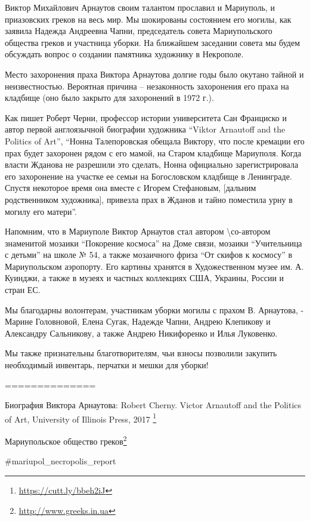 Виктор Михайлович Арнаутов своим талантом прославил и Мариуполь, и приазовских
греков на весь мир. Мы шокированы состоянием его могилы, как заявила Надежда
Андреевна Чапни, председатель совета Мариупольского общества греков и участница
уборки. На ближайшем заседании совета мы будем обсуждать вопрос о создании
памятника художнику в Некрополе.

Место захоронения праха Виктора Арнаутова долгие годы было окутано тайной и
неизвестностью. Вероятная причина – незаконность захоронения его праха на
кладбище (оно было закрыто для захоронений в 1972 г.).

Как пишет Роберт Черни, профессор истории университета Сан Франциско и автор
первой англоязычной биографии художника \enquote{Viktor Arnautoff and the Politics of
Art}, \enquote{Нонна Талепоровская обещала Виктору, что после кремации его прах будет
захоронен рядом с его мамой, на Старом кладбище Мариуполя. Когда власти Жданова
не разрешили это сделать, Нонна официально зарегистрировала его захоронение на
участке ее семьи на Богословском кладбище в Ленинграде. Спустя некоторое время
она вместе с Игорем Стефановым, [дальним родственником художника], привезла
прах в Жданов и тайно поместила урну в могилу его матери}.

Напомним, что в Мариуполе Виктор Арнаутов стал автором \textbackslash со-автором знаменитой
мозаики \enquote{Покорение космоса} на Доме связи, мозаики \enquote{Учительница с детьми} на
школе № 54, а также мозаичного фриза \enquote{От скифов к космосу} в Мариупольском
аэропорту. Его картины хранятся в Художественном музее им. А. Куинджи, а также в
музеях и частных коллекциях США, Украины, России и стран ЕС. 

Мы благодарны волонтерам, участникам уборки могилы с прахом В. Арнаутова, -
Марине Головновой, Елена Сугак, Надежде Чапни, Андрею Клепикову и Александру
Сальникову, а также Андрею Никифоренко и Илья Луковенко.

Мы также признательны благотворителям, чьи взносы позволили закупить необходимый инвентарь, перчатки и мешки для уборки!  

==============

Биография Виктора Арнаутова: Robert Cherny. Victor Arnautoff and the Politics
of Art, University of Illinois Press, 2017 \footnote{\url{https://cutt.ly/bbeh2iJ}}

Мариупольское общество греков\footnote{\url{http://www.greeks.in.ua}}

\#mariupol\_necropolis\_report
